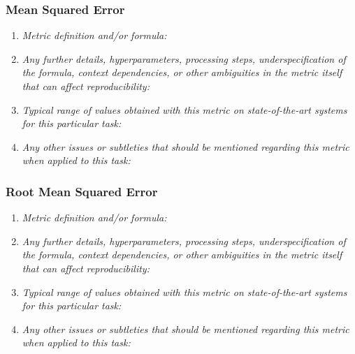 \documentclass[a4paper,11pt]{article}
\begin{document}
        \subsubsection{Mean Squared Error}
            \begin{enumerate}[label=\alph*.]
                \item \textit{Metric definition and/or formula:}
                \bigskip
                \item \textit{Any further details, hyperparameters, processing steps, underspecification of the formula, context dependencies, or other ambiguities in the metric itself that can affect reproducibility:}
                \bigskip
                \item \textit{Typical range of values obtained with this metric on state-of-the-art systems for this particular task:}
                \bigskip
                \item \textit{Any other issues or subtleties that should be mentioned regarding this metric when applied to this task:}
                \bigskip
            \end{enumerate}
        \subsubsection{Root Mean Squared Error}
            \begin{enumerate}[label=\alph*.]
                \item \textit{Metric definition and/or formula:}
                \bigskip
                \item \textit{Any further details, hyperparameters, processing steps, underspecification of the formula, context dependencies, or other ambiguities in the metric itself that can affect reproducibility:}
                \bigskip
                \item \textit{Typical range of values obtained with this metric on state-of-the-art systems for this particular task:}
                \bigskip
                \item \textit{Any other issues or subtleties that should be mentioned regarding this metric when applied to this task:}
                \bigskip
            \end{enumerate}
\end{document}
